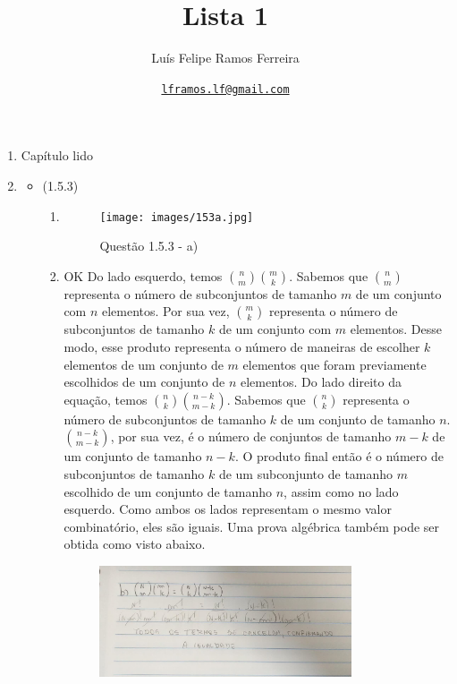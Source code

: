 \documentclass{article}
\title{Lista 1}
\author{Luís Felipe Ramos Ferreira}
\date{\href{mailto:lframos.lf@gmail.com}{\texttt{lframos.lf@gmail.com}}
}
\begin{document}
\maketitle

\begin{enumerate}

	\item Capítulo lido
	\item
	      \begin{itemize}
		      \item (1.5.3)
		            \begin{enumerate}
			            \item
			                  \begin{figure}[H]
				                  \centering
				                  \texttt{[image: images/153a.jpg]}
				                  \caption{Questão 1.5.3 - a)}
			                  \end{figure}
			            \item
			                  OK Do lado esquerdo, temos \(\binom{n}{m} \binom{m}{k}\). Sabemos que \(\binom{n}{m}\) representa o número de subconjuntos de tamanho \(m\) de um conjunto com
			                  \(n\) elementos. Por sua vez, \(\binom{m}{k}\) representa o número de subconjuntos de tamanho \(k\) de um conjunto com \(m\) elementos. Desse modo, esse produto representa o número de maneiras de escolher \(k\) elementos de um conjunto de \(m\) elementos que foram previamente escolhidos de um conjunto de \(n\) elementos.
			                  Do lado direito da equação, temos \(\binom{n}{k} \binom{n - k}{m - k}\). Sabemos que \(\binom{n}{k}\) representa o número de subconjuntos de tamanho \(k\) de um conjunto de tamanho \(n\). \(\binom{n-k}{m-k}\), por sua vez, é o número de conjuntos de tamanho \(m-k\) de um conjunto de tamanho \(n-k\). O produto final então é o número de subconjuntos de tamanho \(k\) de um subconjunto de tamanho \(m\) escolhido de um conjunto de tamanho \(n\), assim como no lado esquerdo. Como ambos os lados representam o mesmo valor combinatório, eles são iguais.
			                  Uma prova algébrica também pode ser obtida como visto abaixo.
			                  \begin{figure}[H]
				                  \centering
				                  \includegraphics[width=0.8\textwidth]{images/153b.jpg}

\end{figure}
\end{enumerate}
\end{itemize}
\end{enumerate}
\end{document}
